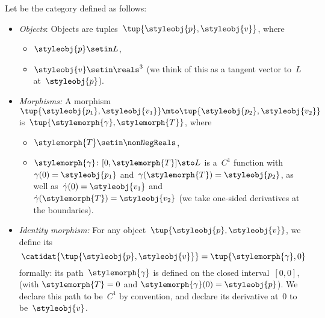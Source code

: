 \begin{definition}[\Berg]
    \label{def:Berg}
    Let \Berg be the category defined as follows:
    \begin{itemize}
        \item \emph{Objects}: Objects are tuples~$\tup{\styleobj{p},\styleobj{v}}$, where
              \begin{itemize}
                  \item $\styleobj{p} \setin L$,
                  \item $\styleobj{v} \setin \reals^3$ (we think of this as a tangent vector to~$L$ at~$\styleobj{p}$).
              \end{itemize}

        \item \emph{Morphisms:}
              A morphism~$\tup{\styleobj{p_1}, \styleobj{v_1}} \mto \tup{\styleobj{p_2}, \styleobj{v_2}}$ is~$\tup{\stylemorph{\gamma}, \stylemorph{T}}$,
              where
              \begin{itemize}
                  \item $\stylemorph{T} \setin \nonNegReals$,
                  \item $\stylemorph{\gamma} \colon [0, \stylemorph{T}] \sto L$ is a~$C^1$ function with~$\gamma(0)=\styleobj{p_1}$ and~$\gamma(\stylemorph{T})=\styleobj{p_2}$, as well as~$\dot \gamma(0) = \styleobj{v_1}$ and~$\dot \gamma(\stylemorph{T}) = \styleobj{v_2}$  (we take one-sided derivatives at the boundaries).
              \end{itemize}
        \item \emph{Identity morphism:}
              For any object~$\tup{\styleobj{p}, \styleobj{v}}$, we define its 
              \begin{equation}
                  \catidat{\tup{\styleobj{p},\styleobj{v}}} = \tup{\stylemorph{\gamma}, 0}
              \end{equation}
              formally: its path~$\stylemorph{\gamma}$ is defined on the closed interval~$[0,0]$, (with $\stylemorph{T}=0$ and $\stylemorph{\gamma}(0) = \styleobj{p}$).
              We declare this path to be~$C^1$ by convention, and declare its derivative at~$0$ to be~$\styleobj{v}$.


\end{itemize}
\end{definition}
